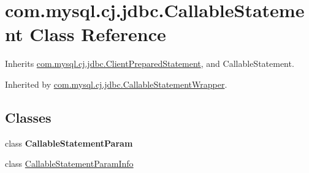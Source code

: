 \hypertarget{classcom_1_1mysql_1_1cj_1_1jdbc_1_1_callable_statement}{}\section{com.\+mysql.\+cj.\+jdbc.\+Callable\+Statement Class Reference}
\label{classcom_1_1mysql_1_1cj_1_1jdbc_1_1_callable_statement}


Inherits \mbox{\hyperlink{classcom_1_1mysql_1_1cj_1_1jdbc_1_1_client_prepared_statement}{com.\+mysql.\+cj.\+jdbc.\+Client\+Prepared\+Statement}}, and Callable\+Statement.



Inherited by \mbox{\hyperlink{classcom_1_1mysql_1_1cj_1_1jdbc_1_1_callable_statement_wrapper}{com.\+mysql.\+cj.\+jdbc.\+Callable\+Statement\+Wrapper}}.

\subsection*{Classes}
\begin{DoxyCompactItemize}
\item 
class {\bfseries Callable\+Statement\+Param}
\item 
class \mbox{\hyperlink{classcom_1_1mysql_1_1cj_1_1jdbc_1_1_callable_statement_1_1_callable_statement_param_info}{Callable\+Statement\+Param\+Info}}
\end{DoxyCompactItemize}
